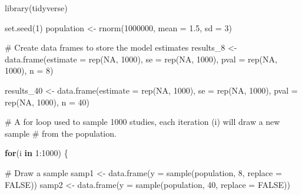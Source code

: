 \documentclass[
  letterpaper,
  DIV=11,
  numbers=noendperiod]{scrreprt}
\newenvironment{Shaded}{\begin{snugshade}}{\end{snugshade}}
\newcommand{\AttributeTok}[1]{\textcolor[rgb]{0.40,0.45,0.13}{#1}}
\newcommand{\CommentTok}[1]{\textcolor[rgb]{0.37,0.37,0.37}{#1}}
\newcommand{\ConstantTok}[1]{\textcolor[rgb]{0.56,0.35,0.01}{#1}}
\newcommand{\ControlFlowTok}[1]{\textcolor[rgb]{0.00,0.23,0.31}{\textbf{#1}}}
\newcommand{\DecValTok}[1]{\textcolor[rgb]{0.68,0.00,0.00}{#1}}
\newcommand{\FloatTok}[1]{\textcolor[rgb]{0.68,0.00,0.00}{#1}}
\newcommand{\FunctionTok}[1]{\textcolor[rgb]{0.28,0.35,0.67}{#1}}
\newcommand{\NormalTok}[1]{\textcolor[rgb]{0.00,0.23,0.31}{#1}}
\newcommand{\OtherTok}[1]{\textcolor[rgb]{0.00,0.23,0.31}{#1}}
\newcommand{\SpecialCharTok}[1]{\textcolor[rgb]{0.37,0.37,0.37}{#1}}
\begin{document}
\begin{Shaded}
\begin{Highlighting}[]
\FunctionTok{library}\NormalTok{(tidyverse)}

\FunctionTok{set.seed}\NormalTok{(}\DecValTok{1}\NormalTok{)}
\NormalTok{population }\OtherTok{\textless{}{-}} \FunctionTok{rnorm}\NormalTok{(}\DecValTok{1000000}\NormalTok{, }\AttributeTok{mean =} \FloatTok{1.5}\NormalTok{, }\AttributeTok{sd =} \DecValTok{3}\NormalTok{)}

\CommentTok{\# Create data frames to store the model estimates}
\NormalTok{results\_8 }\OtherTok{\textless{}{-}} \FunctionTok{data.frame}\NormalTok{(}\AttributeTok{estimate =} \FunctionTok{rep}\NormalTok{(}\ConstantTok{NA}\NormalTok{, }\DecValTok{1000}\NormalTok{), }
                      \AttributeTok{se =} \FunctionTok{rep}\NormalTok{(}\ConstantTok{NA}\NormalTok{, }\DecValTok{1000}\NormalTok{), }
                      \AttributeTok{pval =} \FunctionTok{rep}\NormalTok{(}\ConstantTok{NA}\NormalTok{, }\DecValTok{1000}\NormalTok{), }
                      \AttributeTok{n =} \DecValTok{8}\NormalTok{)  }

\NormalTok{results\_40 }\OtherTok{\textless{}{-}} \FunctionTok{data.frame}\NormalTok{(}\AttributeTok{estimate =} \FunctionTok{rep}\NormalTok{(}\ConstantTok{NA}\NormalTok{, }\DecValTok{1000}\NormalTok{), }
                      \AttributeTok{se =} \FunctionTok{rep}\NormalTok{(}\ConstantTok{NA}\NormalTok{, }\DecValTok{1000}\NormalTok{), }
                      \AttributeTok{pval =} \FunctionTok{rep}\NormalTok{(}\ConstantTok{NA}\NormalTok{, }\DecValTok{1000}\NormalTok{), }
                      \AttributeTok{n =} \DecValTok{40}\NormalTok{)}

\CommentTok{\# A for loop used to sample 1000 studies, each iteration (i) will draw a new sample}
\CommentTok{\# from the population. }

\ControlFlowTok{for}\NormalTok{(i }\ControlFlowTok{in} \DecValTok{1}\SpecialCharTok{:}\DecValTok{1000}\NormalTok{) \{}
  
  \CommentTok{\# Draw a sample }
\NormalTok{  samp1 }\OtherTok{\textless{}{-}} \FunctionTok{data.frame}\NormalTok{(}\AttributeTok{y =} \FunctionTok{sample}\NormalTok{(population, }\DecValTok{8}\NormalTok{, }\AttributeTok{replace =} \ConstantTok{FALSE}\NormalTok{))}
\NormalTok{  samp2 }\OtherTok{\textless{}{-}} \FunctionTok{data.frame}\NormalTok{(}\AttributeTok{y =} \FunctionTok{sample}\NormalTok{(population, }\DecValTok{40}\NormalTok{, }\AttributeTok{replace =} \ConstantTok{FALSE}\NormalTok{))}


\end{Highlighting}
\end{Shaded}
\end{document}
